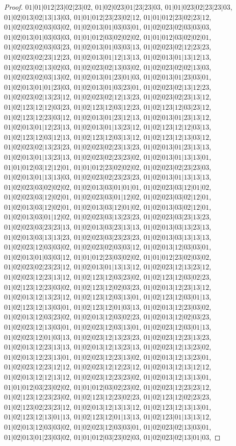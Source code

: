 \documentclass[12pt]{article}
\theoremstyle{plain}
\theoremstyle{definition}
\theoremstyle{remark}
\begin{document}
\begin{proof}
$01|01|012|23|02|23|02$, $01|02|023|01|23|23|03$, $01|01|023|02|23|23|03$, $01|02|013|02|13|13|03$, $01|01|012|23|23|02|12$, $01|01|012|23|02|23|12$, $01|02|023|02|03|03|02$, $01|02|013|01|03|03|01$, $01|02|023|02|03|03|03$, $01|02|013|01|03|03|03$, $01|01|012|03|02|02|02$, $01|01|012|03|02|02|01$, $01|02|023|02|03|03|23$, $01|02|013|01|03|03|13$, $01|02|023|02|12|23|23$, $01|02|023|02|23|12|23$, $01|02|013|01|12|13|13$, $01|02|013|01|13|12|13$, $01|02|023|02|13|02|03$, $01|02|023|02|13|03|02$, $01|02|023|02|02|13|03$, $01|02|023|02|03|13|02$, $01|02|013|01|23|01|03$, $01|02|013|01|23|03|01$, $01|02|013|01|01|23|03$, $01|02|013|01|03|23|01$, $01|02|023|02|13|12|23$, $01|02|023|02|13|23|12$, $01|02|023|02|12|13|23$, $01|02|023|02|23|13|12$, $01|02|123|12|12|03|23$, $01|02|123|12|03|12|23$, $01|02|123|12|03|23|12$, $01|02|123|12|23|03|12$, $01|02|013|01|23|12|13$, $01|02|013|01|23|13|12$, $01|02|013|01|12|23|13$, $01|02|013|01|13|23|12$, $01|02|123|12|12|03|13$, $01|02|123|12|03|12|13$, $01|02|123|12|03|13|12$, $01|02|123|12|13|03|12$, $01|02|023|02|13|23|23$, $01|02|023|02|23|13|23$, $01|02|013|01|23|13|13$, $01|02|013|01|13|23|13$, $01|02|023|02|23|23|02$, $01|02|013|01|13|13|01$, $01|01|012|03|12|12|01$, $01|01|012|23|02|02|02$, $01|02|023|02|23|23|03$, $01|02|013|01|13|13|03$, $01|02|023|02|23|23|23$, $01|02|013|01|13|13|13$, $01|02|023|03|02|02|02$, $01|02|013|03|01|01|01$, $01|02|023|03|12|01|02$, $01|02|023|03|12|02|01$, $01|02|023|03|01|12|02$, $01|02|023|03|02|12|01$, $01|02|013|03|12|02|01$, $01|02|013|03|12|01|02$, $01|02|013|03|02|12|01$, $01|02|013|03|01|12|02$, $01|02|023|03|13|23|23$, $01|02|023|03|23|13|23$, $01|02|023|03|23|23|13$, $01|02|013|03|23|13|13$, $01|02|013|03|13|23|13$, $01|02|013|03|13|13|23$, $01|02|023|03|23|23|23$, $01|02|013|03|13|13|13$, $01|02|023|12|03|03|02$, $01|02|023|02|03|03|12$, $01|02|013|12|03|03|01$, $01|02|013|01|03|03|12$, $01|01|012|23|03|02|02$, $01|01|012|23|02|03|02$, $01|02|023|02|23|23|12$, $01|02|013|01|13|13|12$, $01|02|023|12|13|23|12$, $01|02|023|12|23|13|12$, $01|02|123|12|03|23|02$, $01|02|123|12|03|02|23$, $01|02|123|12|23|03|02$, $01|02|123|12|02|03|23$, $01|02|013|12|23|13|12$, $01|02|013|12|13|23|12$, $01|02|123|12|03|13|01$, $01|02|123|12|03|01|13$, $01|02|123|12|13|03|01$, $01|02|123|12|01|03|13$, $01|02|013|12|23|03|02$, $01|02|013|12|03|23|02$, $01|02|013|12|03|02|23$, $01|02|013|12|02|03|23$, $01|02|023|12|13|03|01$, $01|02|023|12|03|13|01$, $01|02|023|12|03|01|13$, $01|02|023|12|01|03|13$, $01|02|023|12|13|23|23$, $01|02|023|12|23|13|23$, $01|02|013|12|23|13|13$, $01|02|013|12|13|23|13$, $01|02|023|12|13|23|02$, $01|02|013|12|23|13|01$, $01|02|023|12|23|13|02$, $01|02|013|12|13|23|01$, $01|02|023|12|23|12|12$, $01|02|023|12|12|23|12$, $01|02|013|12|13|12|12$, $01|02|013|12|12|13|12$, $01|02|023|12|23|23|02$, $01|02|013|12|13|13|01$, $01|01|012|03|23|02|02$, $01|01|012|03|02|23|02$, $01|02|023|12|23|23|12$, $01|02|123|12|23|23|02$, $01|02|123|12|23|02|23$, $01|02|123|12|02|23|23$, $01|02|123|02|23|23|12$, $01|02|013|12|13|13|12$, $01|02|123|12|13|13|01$, $01|02|123|12|13|01|13$, $01|02|123|12|01|13|13$, $01|02|123|01|13|13|12$, $01|02|013|12|03|03|02$, $01|02|023|12|03|03|01$, $01|02|023|02|13|03|01$, $01|02|013|01|23|03|02$, $01|01|012|03|23|02|03$, $01|02|023|02|13|01|03$, 
\end{proof}
\end{document}
